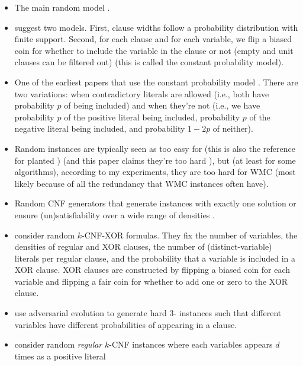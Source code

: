 \documentclass{article}
\theoremstyle{definition}
\theoremstyle{remark}
\begin{document}
\begin{itemize}
\item The main random model
  \cite{DBLP:journals/dam/FrancoP83,DBLP:journals/siamcomp/PurdomB83}.
\item \cite{DBLP:conf/ecai/GentW94} suggest two models. First, clause widths
  follow a probability distribution with finite support. Second, for each clause
  and for each variable, we flip a biased coin for whether to include the
  variable in the clause or not (empty and unit clauses can be filtered out)
  (this is called the constant probability model).
\item One of the earliest papers that use the constant probability model
  \cite{DBLP:conf/aaai/MitchellSL92,DBLP:journals/ipl/GoldbergPB82}. There are
  two variations: when contradictory literals are allowed (i.e., both have
  probability $p$ of being included) and when they're not (i.e., we have
  probability $p$ of the positive literal being included, probability $p$ of the
  negative literal being included, and probability $1-2p$ of neither).
\item Random instances are typically seen as too easy for \SAT{}
  \cite{DBLP:conf/ijcai/ChaI95} (this is also the reference for planted \SAT{})
  (and this paper claims they're too hard \cite{DBLP:conf/focs/AchlioptasM02}),
  but (at least for some algorithms), according to my experiments, they are too
  hard for \textsf{WMC} (most likely because of all the redundancy that
  \textsf{WMC} instances often have).
\item Random CNF generators that generate instances with exactly one
  solution or ensure (un)satisfiability over a wide range of densities
  \cite{DBLP:conf/dimacs/AsahiroIM93}.
\item \cite{DBLP:conf/ijcai/DudekMV17} consider random $k$-CNF-XOR formulas.
  They fix the number of variables, the densities of regular and XOR clauses,
  the number of (distinct-variable) literals per regular clause, and the
  probability that a variable is included in a XOR clause. XOR clauses are
  constructed by flipping a biased coin for each variable and flipping a fair
  coin for whether to add one or zero to the XOR clause.
\item \cite{DBLP:conf/cec/HossainALA10} use adversarial evolution to generate
  hard 3-\SAT{} instances such that different variables have different
  probabilities of appearing in a clause.
\item \cite{DBLP:journals/cpc/Coja-OghlanW18} consider random \emph{regular}
  $k$-CNF instances where each variables appears $d$ times as a positive literal

\end{itemize}
\end{document}

